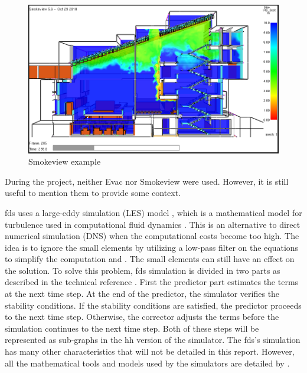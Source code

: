 \begin{figure}[h!]
  \begin{center}
    \includegraphics[scale=0.5]{img/smvexample.png}
    \caption{Smokeview example}
    \label{fig:smvexample}
  \end{center}
\end{figure}

During the project, neither Evac nor Smokeview were used. However, it is
still useful to mention them to provide some context.

\gls{fds} uses a large-eddy simulation (LES) model \cite{fdsref}, which is a
mathematical model for turbulence used in computational fluid dynamics
\cite{enwiki:les}. This is an alternative to direct numerical simulation (DNS)
when the computational costs become too high. The idea is to ignore the small
elements by utilizing a low-pass filter on the equations to simplify the
computation \cite{enwiki:les} and \cite{ferziger1996large}. The small elements
can still have an effect on the solution. To solve this problem, \gls{fds}
simulation is divided in two parts as described in the technical reference
\cite{fdsref}. First the predictor part estimates the terms at the next time
step. At the end of the predictor, the simulator verifies the stability
conditions. If the stability conditions are satisfied, the predictor proceeds to
the next time step. Otherwise, the corrector adjusts the terms before the
simulation continues to the next time step. Both of these steps will be
represented as sub-graphs in the \gls{hh} version of the simulator. The
\gls{fds}'s simulation has many other characteristics that will not be detailed
in this report. However, all the mathematical tools and models used by the
simulators are detailed by \cite{fdsref}.

